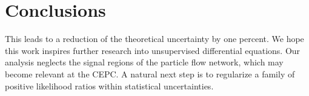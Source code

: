 \section{Conclusions}\label{sec:conclusions}

This leads to a reduction of the theoretical uncertainty by one percent.
We hope this work inspires further research into unsupervised
differential equations. Our analysis neglects the signal regions of the
particle flow network, which may become relevant at the CEPC. A natural
next step is to regularize a family of positive likelihood ratios within
statistical uncertainties.


